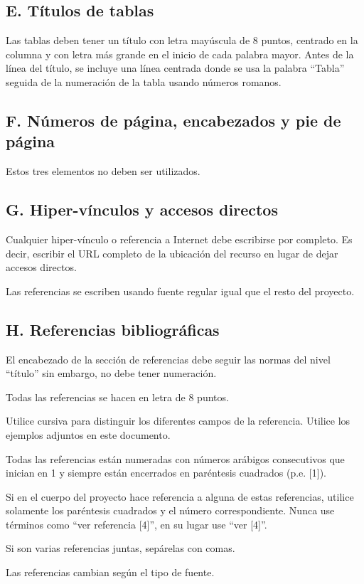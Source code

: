 ﻿\documentclass[10pt,twocolumn]{article}
\begin{document}
\subsection*{E. Títulos de tablas}
Las tablas deben tener un título con letra mayúscula de 8 puntos, centrado en la columna y con letra más grande en el inicio de cada palabra mayor. Antes de la línea del título, se incluye una línea centrada donde se usa la palabra “Tabla” seguida de la numeración de la tabla usando números romanos.

\subsection*{F. Números de página, encabezados y pie de página}
Estos tres elementos no deben ser utilizados.

\subsection*{G. Hiper-vínculos y accesos directos}
Cualquier hiper-vínculo o referencia a Internet debe escribirse por completo. Es decir, escribir el URL completo de la ubicación del recurso en lugar de dejar accesos directos.

Las referencias se escriben usando fuente regular igual que el resto del proyecto.

\subsection*{H. Referencias bibliográficas}
El encabezado de la sección de referencias debe seguir las normas del nivel “título” sin embargo, no debe tener numeración.

Todas las referencias se hacen en letra de 8 puntos.

Utilice cursiva para distinguir los diferentes campos de la referencia. Utilice los ejemplos adjuntos en este documento.

Todas las referencias están numeradas con números arábigos consecutivos que inician en 1 y siempre están encerrados en paréntesis cuadrados (p.e. [1]).

Si en el cuerpo del proyecto hace referencia a alguna de estas referencias, utilice solamente los paréntesis cuadrados y el número correspondiente. Nunca use términos como “ver referencia [4]”, en su lugar use “ver [4]”.

Si son varias referencias juntas, sepárelas con comas.

Las referencias cambian según el tipo de fuente.
\end{document}
